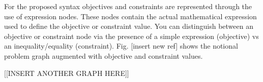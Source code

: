 For the proposed syntax objectives and constraints are represented through the use of 
expression nodes. These nodes contain the actual mathematical expression used to define the 
objective or constraint value. You can distinguish between an objective or constraint node 
via the presence of a simple expression (objective) vs an inequality/equality (constraint). 
Fig. [insert new ref] shows the notional problem graph augmented with objective and 
constraint values. 

[[INSERT ANOTHER GRAPH HERE]]

